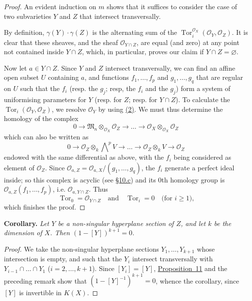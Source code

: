 \documentclass{article}
\newenvironment{itenv}[1]
  {\phantomsection\par\medskip\noindent\textbf{#1.}\itshape}
  {\par\medskip}
\newcommand{\scr}[1]{{\mathscr{#1}}}
\renewcommand{\geq}{\geqslant}
\DeclareMathOperator{\Tor}{Tor}
\newcommand{\oldpage}[1]{\marginpar{\footnotesize$\Big\vert$ \textit{p.~#1}}}
\begin{document}
\begin{proof}
  An evident induction on $m$ shows that it suffices to consider the case of two subvarieties $Y$ and $Z$ that intersect transversally.

  By definition, $\gamma(Y)\cdot\gamma(Z)$ is the alternating sum of the $\Tor_i^{\scr{O}_X}(\scr{O}_Y,\scr{O}_Z)$.
  It is clear that these sheaves, and the sheaf $\scr{O}_{Y\cap Z}$, are equal (and zero) at any point not contained inside $Y\cap Z$, which, in particular, proves our claim if $Y\cap Z=\varnothing$.

  Now let $a\in Y\cap Z$.
  Since $Y$ and $Z$ intersect transversally, we can find an affine open subset $U$ containing $a$, and functions $f_1,\ldots,f_p$ and $g_1,\ldots,g_q$ that are regular on $U$ such that the $f_i$ (resp. the $g_j$; resp, the $f_i$ and the $g_j$) form a system of uniformising parameters for $Y$ (resp. for $Z$; resp. for $Y\cap Z$).
  To calculate the $\Tor_i(\scr{O}_Y,\scr{O}_Z)$, we resolve $\scr{O}_Y$ by using \hyperref[section10cequation2]{(2)}.
  We must thus determine the homology of the complex
  \[
    0 \to \mathfrak{M}_n\otimes_{\scr{O}_X}\scr{O}_Z \to \ldots \to \scr{O}_X\otimes_{\scr{O}_X}\scr{O}_Z
  \]
  which can also be written as
  \[
    0 \to \scr{O}_Z\otimes_k\bigwedge\nolimits^p V \to \ldots \to \scr{O}_Z\otimes_k V \to \scr{O}_Z
  \]
  endowed with the same differential as above, with the $f_i$ being considered as element of $\scr{O}_Z$.
  Since $\scr{O}_{a,Z} = \scr{O}_{a,X}/(g_1,\ldots,g_q)$, the $f_i$ generate a perfect ideal inside;
  so this complex is acyclic (see \hyperref[subsection10c]{\S10.c}) and its $0$th homology group is $\scr{O}_{a,Z}(f_1,\ldots,f_p)$, i.e. $\scr{O}_{a,Y\cap Z}$.
  Thus
  \[
    \Tor_0 = \scr{O}_{Y\cap Z}
    \quad\text{and}\quad
    \Tor_i = 0
    \quad\mbox{(for $i\geq1$),}
  \]
  which finishes the proof.
\end{proof}

\oldpage{122}
\begin{itenv}{Corollary}
\label{corollary-11}
  Let $Y$ be a non-singular hyperplane section of $Z$, and let $k$ be the dimension of $X$.
  Then $(1-[Y])^{k+1}=0$.
\end{itenv}

\begin{proof}
  We take the non-singular hyperplane sections $Y_1,\ldots,Y_{k+1}$ whose intersection is empty, and such that the $Y_i$ intersect transversally with $Y_{i-1}\cap\ldots\cap Y_1$ ($i=2,\ldots,k+1$).
  Since $[Y_i]=[Y]$, \hyperref[proposition11]{Proposition~11} and the preceding remark show that $(1-[Y]^{-1})^{k+1} = 0$, whence the corollary, since $[Y]$ is invertible in $K(X)$.
\end{proof}
\end{document}
